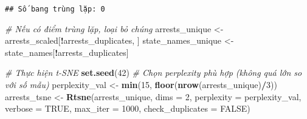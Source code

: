 \documentclass[
]{article}
\newenvironment{Shaded}{\begin{snugshade}}{\end{snugshade}}
\newcommand{\AttributeTok}[1]{\textcolor[rgb]{0.13,0.29,0.53}{#1}}
\newcommand{\CommentTok}[1]{\textcolor[rgb]{0.56,0.35,0.01}{\textit{#1}}}
\newcommand{\ConstantTok}[1]{\textcolor[rgb]{0.56,0.35,0.01}{#1}}
\newcommand{\DecValTok}[1]{\textcolor[rgb]{0.00,0.00,0.81}{#1}}
\newcommand{\FunctionTok}[1]{\textcolor[rgb]{0.13,0.29,0.53}{\textbf{#1}}}
\newcommand{\NormalTok}[1]{#1}
\newcommand{\OtherTok}[1]{\textcolor[rgb]{0.56,0.35,0.01}{#1}}
\newcommand{\SpecialCharTok}[1]{\textcolor[rgb]{0.81,0.36,0.00}{\textbf{#1}}}
\begin{document}
\begin{verbatim}
## Số bang trùng lặp: 0
\end{verbatim}

\begin{Shaded}
\begin{Highlighting}[]
\CommentTok{\# Nếu có điểm trùng lặp, loại bỏ chúng}
\NormalTok{arrests\_unique }\OtherTok{\textless{}{-}}\NormalTok{ arrests\_scaled[}\SpecialCharTok{!}\NormalTok{arrests\_duplicates, ]}
\NormalTok{state\_names\_unique }\OtherTok{\textless{}{-}}\NormalTok{ state\_names[}\SpecialCharTok{!}\NormalTok{arrests\_duplicates]}

\CommentTok{\# Thực hiện t{-}SNE}
\FunctionTok{set.seed}\NormalTok{(}\DecValTok{42}\NormalTok{)}
\CommentTok{\# Chọn perplexity phù hợp (không quá lớn so với số mẫu)}
\NormalTok{perplexity\_val }\OtherTok{\textless{}{-}} \FunctionTok{min}\NormalTok{(}\DecValTok{15}\NormalTok{, }\FunctionTok{floor}\NormalTok{(}\FunctionTok{nrow}\NormalTok{(arrests\_unique)}\SpecialCharTok{/}\DecValTok{3}\NormalTok{))}
\NormalTok{arrests\_tsne }\OtherTok{\textless{}{-}} \FunctionTok{Rtsne}\NormalTok{(arrests\_unique, }\AttributeTok{dims =} \DecValTok{2}\NormalTok{, }\AttributeTok{perplexity =}\NormalTok{ perplexity\_val, }
                     \AttributeTok{verbose =} \ConstantTok{TRUE}\NormalTok{, }\AttributeTok{max\_iter =} \DecValTok{1000}\NormalTok{, }\AttributeTok{check\_duplicates =} \ConstantTok{FALSE}\NormalTok{)}
\end{Highlighting}
\end{Shaded}
\end{document}

